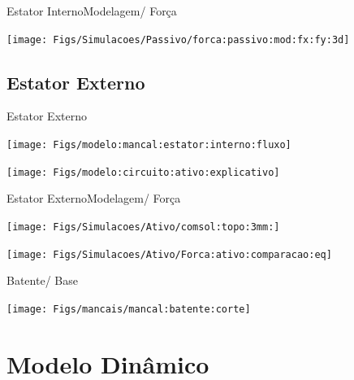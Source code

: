 \documentclass{beamer}
\begin{document}
\begin{frame}{Estator Interno}{Modelagem/ Força}

\begin{center}
\texttt{[image: Figs/Simulacoes/Passivo/forca:passivo:mod:fx:fy:3d]}
\end{center}

\end{frame}


\subsection{Estator Externo}

\begin{frame}{Estator Externo}{}

	\begin{center}
	\texttt{[image: Figs/modelo:mancal:estator:interno:fluxo]}
	\end{center}
		\begin{center}
		\texttt{[image: Figs/modelo:circuito:ativo:explicativo]}
		\end{center}
		
\end{frame}

\begin{frame}{Estator Externo}{Modelagem/ Força}

	\begin{minipage}[c]{0.48\linewidth}
		\begin{center}
		\texttt{[image: Figs/Simulacoes/Ativo/comsol:topo:3mm:]}
		\end{center}
	\end{minipage}
	\begin{minipage}[c]{0.48\linewidth}
		\begin{center}
		\texttt{[image: Figs/Simulacoes/Ativo/Forca:ativo:comparacao:eq]}
		\end{center}
	\end{minipage}	


\end{frame}

\begin{frame}{Batente/ Base}
\begin{center}
\texttt{[image: Figs/mancais/mancal:batente:corte]}
\end{center}

\end{frame}

\section{Modelo Dinâmico}
\end{document}
